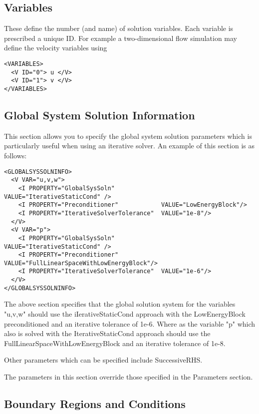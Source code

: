 \subsection{Variables}

These define the number (and name) of solution variables. Each variable is
prescribed a unique ID. For example a two-dimensional flow simulation may define
the velocity variables using

\begin{lstlisting}[style=XMLStyle]
<VARIABLES>
  <V ID="0"> u </V>
  <V ID="1"> v </V>
</VARIABLES>
\end{lstlisting}

\subsection{Global System Solution Information}

This section allows you to specify the global system solution parameters which
is particularly useful when using an iterative solver. An example of this
section is as follows:

\begin{lstlisting}[style=XMLStyle]
<GLOBALSYSSOLNINFO>
  <V VAR="u,v,w">
    <I PROPERTY="GlobalSysSoln"             VALUE="IterativeStaticCond" />
    <I PROPERTY="Preconditioner"            VALUE="LowEnergyBlock"/>
    <I PROPERTY="IterativeSolverTolerance"  VALUE="1e-8"/>
  </V>
  <V VAR="p">
    <I PROPERTY="GlobalSysSoln"             VALUE="IterativeStaticCond" />
    <I PROPERTY="Preconditioner"     VALUE="FullLinearSpaceWithLowEnergyBlock"/>
    <I PROPERTY="IterativeSolverTolerance"  VALUE="1e-6"/>
  </V>
</GLOBALSYSSOLNINFO>
\end{lstlisting}

The above section specifies that the global solution system for the variables
"u,v,w" should use the iIerativeStaticCond approach with the LowEnergyBlock
preconditioned and an iterative tolerance of 1e-6.  Where as the variable "p"
which also is solved with the IterativeStaticCond approach should use the
FullLinearSpaceWithLowEnergyBlock and an iterative tolerance of 1e-8.

Other parameters which can be specified include SuccessiveRHS. 

The parameters in this section override those specified in the Parameters section. 

\subsection{Boundary Regions and Conditions}

